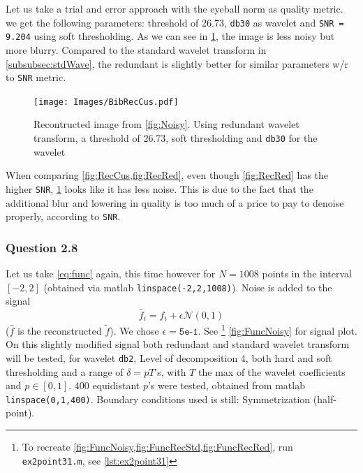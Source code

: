 \documentclass[a4paper]{article}
\begin{document}
	Let us take a trial and error approach with the eyeball norm as quality metric. we get the following parameters: threshold of 26.73, \texttt{db30} as wavelet and \texttt{SNR = 9.204} using soft thresholding. As we can see in \cref{fig:RecCus}, the image is less noisy but more blurry. Compared to the standard wavelet transform in \cref{subsubsec:stdWave}, the redundant is slightly better for similar parameters w/r to \texttt{SNR} metric.

    \begin{figure}[H]
	\centering
	\texttt{[image: Images/BibRecCus.pdf]}
	\caption{Recontructed image from \cref{fig:Noisy}. Using redundant wavelet transform, a threshold of 26.73, soft thresholding and \texttt{db30} for the wavelet}
	\label{fig:RecCus}
\end{figure}

	 When comparing \cref{fig:RecCus,fig:RecRed}, even though \cref{fig:RecRed} has the higher \texttt{SNR}, \cref{fig:RecCus} looks like it has less noise. This is due to the fact that the additional blur and lowering in quality is too much of a price to pay to denoise properly, according to \texttt{SNR}.

    \subsubsection{Question 2.8} \label{subsubsec:SignNew}

	Let us take \cref{eq:func} again, this time however for $N=1008$ points in the interval $[-2,2]$ (obtained via matlab \texttt{linspace(-2,2,1008)}). Noise is added to the signal 
	\begin{equation} \label{eq:funcNoise}
		\tilde{f_i} = f_i + \epsilon \mathcal{N}(0,1)
	\end{equation}
	($\hat{f}$ is the reconstructed $\tilde{f}$). We chose $\epsilon = \texttt{5e-1}$. See \footnote{To recreate \cref{fig:FuncNoisy,fig:FuncRecStd,fig:FuncRecRed}, run \texttt{ex2point31.m}, see \cref{lst:ex2point31}} \cref{fig:FuncNoisy} for signal plot.\\
	
	On this slightly modified signal both redundant and standard wavelet transform will be tested, for wavelet \texttt{db2}, Level of decomposition 4, both hard and soft thresholding and a range of $\delta = p T$'s, with $T$ the max of the wavelet coefficients and $p \in [0,1]$. 400 equidistant $p$'s were tested, obtained from matlab \texttt{linspace(0,1,400)}. Boundary conditions used is still: Symmetrization (half-point). \\
	
\end{document}
